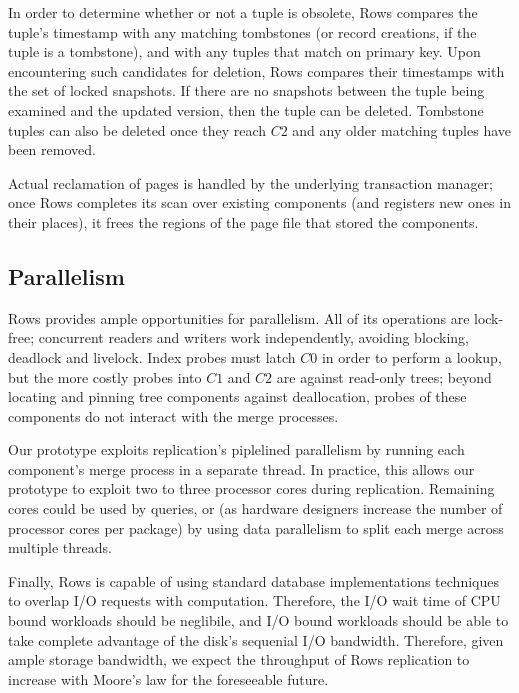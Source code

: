 \documentclass{sig-alternate-sigmod08}
\newcommand{\rows}{Rows\xspace}
\begin{document}
In order to determine whether or not a tuple is obsolete, \rows
compares the tuple's timestamp with any matching tombstones (or record
creations, if the tuple is a tombstone), and with any tuples that
match on primary key.  Upon encountering such candidates for deletion,
\rows compares their timestamps with the set of locked snapshots.  If
there are no snapshots between the tuple being examined and the
updated version, then the tuple can be deleted.  Tombstone tuples can
also be deleted once they reach $C2$ and any older matching tuples
have been removed.

Actual reclamation of pages is handled by the underlying transaction
manager; once \rows completes its scan over existing components (and
registers new ones in their places), it frees the regions of the page
file that stored the components.

\subsection{Parallelism}

\rows provides ample opportunities for parallelism.  All of its
operations are lock-free; concurrent readers and writers work
independently, avoiding blocking, deadlock and livelock.  Index probes
must latch $C0$ in order to perform a lookup, but the more costly
probes into $C1$ and $C2$ are against read-only trees; beyond locating
and pinning tree components against deallocation, probes of these
components do not interact with the merge processes.

Our prototype exploits replication's piplelined parallelism by running
each component's merge process in a separate thread.  In practice,
this allows our prototype to exploit two to three processor cores
during replication.  Remaining cores could be used by queries, or (as
hardware designers increase the number of processor cores per package)
by using data parallelism to split each merge across multiple threads.

Finally, \rows is capable of using standard database implementations
techniques to overlap I/O requests with computation.  Therefore, the
I/O wait time of CPU bound workloads should be neglibile, and I/O
bound workloads should be able to take complete advantage of the
disk's sequenial I/O bandwidth.  Therefore, given ample storage
bandwidth, we expect the throughput of \rows replication to increase
with Moore's law for the foreseeable future.

\end{document}
